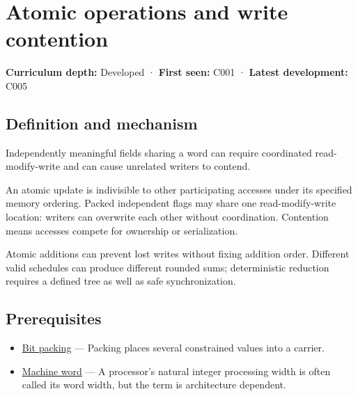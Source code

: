 \hypertarget{appendix-e12d1b03fefb}{}\label{referencestart:appendix-e12d1b03fefb}
\section{Atomic operations and write contention}\label{appendix-e12d1b03fefb-atomic-operations-and-write-contention}

\textbf{Curriculum depth:} Developed · \textbf{First seen:} C001 · \textbf{Latest development:} C005

\begin{allmightroledefinition}

\subsection{Definition and mechanism}\label{appendix-e12d1b03fefb-definition-and-mechanism}

Independently meaningful fields sharing a word can require coordinated read-modify-write and can cause unrelated writers to contend.

\end{allmightroledefinition}

An atomic update is indivisible to other participating accesses under its specified memory ordering. Packed independent flags may share one read-modify-write location: writers can overwrite each other without coordination. Contention means accesses compete for ownership or serialization.

Atomic additions can prevent lost writes without fixing addition order. Different valid schedules can produce different rounded sums; deterministic reduction requires a defined tree as well as safe synchronization.

\subsection{Prerequisites}\label{appendix-e12d1b03fefb-prerequisites}

\begin{itemize}
\tightlist
\item
  \hyperref[appendix-1f9963e1a5d1]{Bit packing} --- Packing places several constrained values into a carrier.
\item
  \hyperref[appendix-d67a19507dc5]{Machine word} --- A processor's natural integer processing width is often called its word width, but the term is architecture dependent.
\end{itemize}

